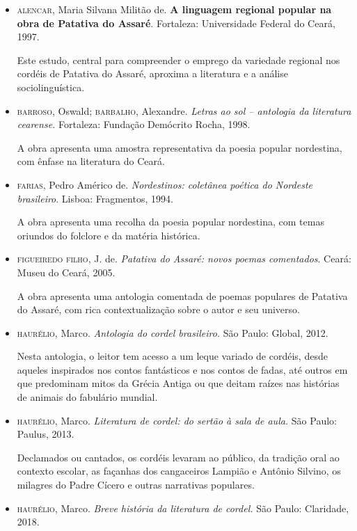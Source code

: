 \documentclass[12pt]{extarticle}
\begin{document}
\begin{itemize}
\begin{itemize}
\begin{itemize}
\item \textsc{alencar}, Maria Silvana Militão de. \textbf{A linguagem regional
  popular na obra de Patativa do Assaré}. Fortaleza: Universidade
  Federal do Ceará, 1997.

Este estudo, central para compreender o emprego da variedade regional
nos cordéis de Patativa do Assaré, aproxima a literatura e a análise
sociolinguística.

\item \textsc{barroso}, Oswald; \textsc{barbalho}, Alexandre. \textit{Letras ao sol --
  antologia da literatura cearense.} Fortaleza: Fundação Demócrito
  Rocha, 1998.

A obra apresenta uma amostra representativa da poesia popular
nordestina, com ênfase na literatura do Ceará.

\item \textsc{farias}, Pedro Américo de. \textit{Nordestinos: coletânea poética do
  Nordeste brasileiro}. Lisboa: Fragmentos, 1994.

A obra apresenta uma recolha da poesia popular nordestina, com temas
oriundos do folclore e da matéria histórica.

\item \textsc{figueiredo filho}, J. de. \textit{Patativa do Assaré: novos poemas
  comentados}. Ceará: Museu do Ceará, 2005.

A obra apresenta uma antologia comentada de poemas populares de Patativa
do Assaré, com rica contextualização sobre o autor e seu universo.

\item \textsc{haurélio}, Marco. \textit{Antologia do cordel brasileiro.} São Paulo:
  Global, 2012.

Nesta antologia, o leitor tem acesso a um leque variado de cordéis,
desde aqueles inspirados nos contos fantásticos e nos contos de fadas,
até outros em que predominam mitos da Grécia Antiga ou que deitam raízes
nas histórias de animais do fabulário mundial.

\item \textsc{haurélio}, Marco. \textit{Literatura de cordel: do sertão à sala de
  aula.} São Paulo: Paulus, 2013.

Declamados ou cantados, os cordéis levaram ao público, da tradição oral
ao contexto escolar, as façanhas dos cangaceiros Lampião e Antônio
Silvino, os milagres do Padre Cícero e outras narrativas populares.


\item \textsc{haurélio}, Marco. \textit{Breve história da literatura de cordel.} São
  Paulo: Claridade, 2018.


\end{itemize}
\end{itemize}
\end{itemize}
\end{document}
